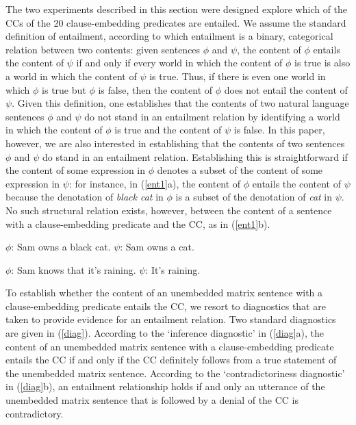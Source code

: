 \documentclass[11pt,fleqn]{article}
\newcommand{\6}{\mbox{$[\hspace*{-.6mm}[$}}
\newcommand{\9}{\mbox{$]\hspace*{-.6mm}]$}}
\begin{document}
The two experiments described in this section were designed explore which of the CCs of the 20 clause-embedding predicates are entailed. We assume the standard definition of entailment, according to which entailment is a binary, categorical relation between two contents: given sentences $\phi$ and $\psi$, the content of $\phi$ entails the content of $\psi$ if and only if every world in which the content of $\phi$ is true is also a world in which the content of $\psi$ is true. Thus, if there is even one world in which $\phi$ is true but $\phi$ is false, then the content of $\phi$ does not entail the content of $\psi$. Given this definition, one establishes that the contents of two natural language sentences $\phi$ and $\psi$ do not stand in an entailment relation by identifying a world in which the content of $\phi$ is true and the content of $\psi$ is false. In this paper, however, we are also interested in establishing that the contents of two sentences $\phi$ and $\psi$  do stand in an entailment relation. Establishing this is straightforward if the content of some expression in $\phi$ denotes a subset of the content of some expression in $\psi$: for instance, in (\ref{ent1}a),  the content of $\phi$ entails the content of $\psi$ because the denotation of {\em black cat} in $\phi$ is a subset of the denotation of {\em cat} in $\psi$. No such structural relation exists, however, between the content of a sentence with a clause-embedding predicate and the CC, as in (\ref{ent1}b). %

\begin{exe}
\ex\label{ent1}
\begin{xlist}
\ex $\phi$: Sam owns a black cat. \hspace*{1.5cm} $\psi$: Sam owns a cat.

\ex $\phi$: Sam knows that it's raining. \hspace*{.6cm} $\psi$: It's raining.

\end{xlist}
\end{exe}

To establish whether the content of an unembedded matrix sentence with a clause-embedding predicate entails the CC, we resort to diagnostics that are taken to provide evidence for an entailment relation. Two standard diagnostics are given in (\ref{diag}). According to the `inference diagnostic' in (\ref{diag}a), the content of an unembedded matrix sentence with a clause-embedding predicate entails the CC if and only if the CC definitely follows from a true statement of the unembedded matrix sentence. According to the `contradictoriness diagnostic' in (\ref{diag}b), an entailment relationship holds if and only an utterance of the unembedded matrix sentence that is followed by a denial of the CC is contradictory. 
\end{document}
